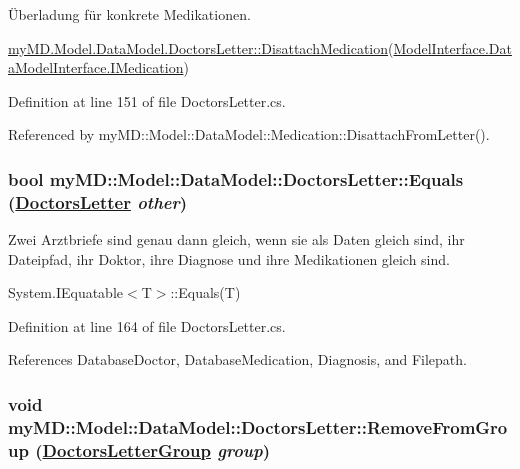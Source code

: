 \"{U}berladung f\"{u}r konkrete Medikationen. 

\hyperlink{classmy_m_d_1_1_model_1_1_data_model_1_1_doctors_letter_054bedc79ee2e214b176609861b0f663}{my\-MD.Model.Data\-Model.Doctors\-Letter::Disattach\-Medication}(\hyperlink{interfacemy_m_d_1_1_model_interface_1_1_data_model_interface_1_1_i_medication}{Model\-Interface.Data\-Model\-Interface.IMedication}) 

Definition at line 151 of file Doctors\-Letter.cs.

Referenced by my\-MD::Model::Data\-Model::Medication::Disattach\-From\-Letter().\hypertarget{classmy_m_d_1_1_model_1_1_data_model_1_1_doctors_letter_727bb18102761937ee7d2d755bf4db6b}{
\subsubsection[Equals]{\setlength{\rightskip}{0pt plus 5cm}bool my\-MD::Model::Data\-Model::Doctors\-Letter::Equals (\hyperlink{classmy_m_d_1_1_model_1_1_data_model_1_1_doctors_letter}{Doctors\-Letter} {\em other})}}
\label{dc/d86/classmy_m_d_1_1_model_1_1_data_model_1_1_doctors_letter_727bb18102761937ee7d2d755bf4db6b}


Zwei Arztbriefe sind genau dann gleich, wenn sie als Daten gleich sind, ihr Dateipfad, ihr Doktor, ihre Diagnose und ihre Medikationen gleich sind. 

System.IEquatable$<$T$>$::Equals(T) 

Definition at line 164 of file Doctors\-Letter.cs.

References Database\-Doctor, Database\-Medication, Diagnosis, and Filepath.\hypertarget{classmy_m_d_1_1_model_1_1_data_model_1_1_doctors_letter_7f55c973858b86b4f86b78d8b55ccd4e}{
\subsubsection[RemoveFromGroup]{\setlength{\rightskip}{0pt plus 5cm}void my\-MD::Model::Data\-Model::Doctors\-Letter::Remove\-From\-Group (\hyperlink{classmy_m_d_1_1_model_1_1_data_model_1_1_doctors_letter_group}{Doctors\-Letter\-Group} {\em group})}}
\label{dc/d86/classmy_m_d_1_1_model_1_1_data_model_1_1_doctors_letter_7f55c973858b86b4f86b78d8b55ccd4e}


